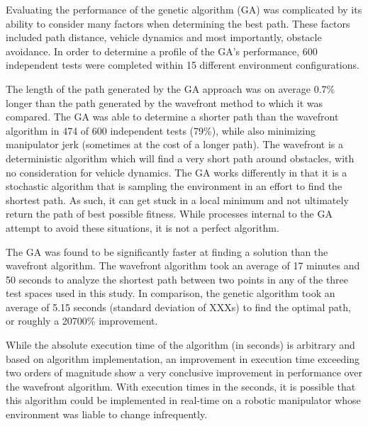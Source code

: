 %
Evaluating the performance of the genetic algorithm (GA) was complicated by its ability to consider many factors when determining the best path. These factors included path distance, vehicle dynamics and most importantly, obstacle avoidance. In order to determine a profile of the GA's performance, 600 independent tests were completed within 15 different environment configurations.

The length of the path generated by the GA approach was on average 0.7\% longer than the path generated by the wavefront method to which it was compared. The GA was able to determine a shorter path than the wavefront algorithm in 474 of 600 independent tests (79\%), while also minimizing manipulator jerk (sometimes at the cost of a longer path). The wavefront is a deterministic algorithm which will find a very short path around obstacles, with no consideration for vehicle dynamics. The GA works differently in that it is a stochastic algorithm that is sampling the environment in an effort to find the shortest path. As such, it can get stuck in a local minimum and not ultimately return the path of best possible fitness. While processes internal to the GA attempt to avoid these situations, it is not a perfect algorithm.

The GA was found to be significantly faster at finding a solution than the wavefront algorithm. The wavefront algorithm took an average of 17 minutes and 50 seconds to analyze the shortest path between two points in any of the three test spaces used in this study. In comparison, the genetic algorithm took an average of 5.15 seconds (standard deviation of XXXs) to find the optimal path, or roughly a 20700\% improvement.

While the absolute execution time of the algorithm (in seconds) is arbitrary and based on algorithm implementation, an improvement in execution time exceeding two orders of magnitude show a very conclusive improvement in performance over the wavefront algorithm. With execution times in the seconds, it is possible that this algorithm could be implemented in real-time on a robotic manipulator whose environment was liable to change infrequently.

